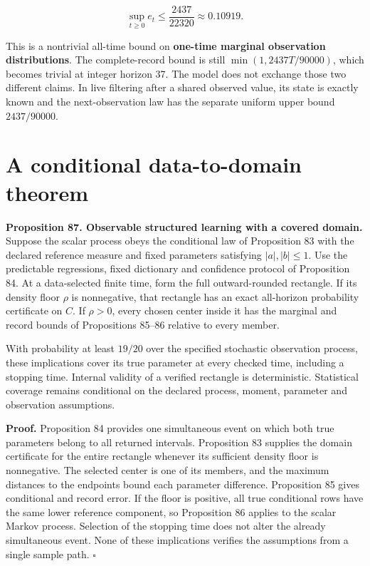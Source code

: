 \[
\boxed{
\sup_{t\geq0}e_t\leq\frac{2437}{22320}
\approx0.10919.
}
\]

This is a nontrivial all-time bound on \textbf{one-time marginal
observation distributions}. The complete-record bound is still
\(\min(1,2437T/90000)\), which becomes trivial at integer horizon 37.
The model does not exchange those two different claims. In live
filtering after a shared observed value, its state is exactly known and
the next-observation law has the separate uniform upper bound
\(2437/90000\).

\section{A conditional data-to-domain theorem}\label{LSM:a-conditional-data-to-domain-theorem}

\textbf{Proposition 87. Observable structured learning with a covered
domain.} Suppose the scalar process obeys the conditional law of
Proposition 83 with the declared reference measure and fixed parameters
satisfying \(|a|,|b|\leq1\). Use the predictable regressions, fixed
dictionary and confidence protocol of Proposition 84. At a data-selected
finite time, form the full outward-rounded rectangle. If its density
floor \(\rho\) is nonnegative, that rectangle has an exact all-horizon
probability certificate on \(C\). If \(\rho>0\), every chosen center
inside it has the marginal and record bounds of Propositions 85--86
relative to every member.

With probability at least \(19/20\) over the specified stochastic
observation process, these implications cover its true parameter at
every checked time, including a stopping time. Internal validity of a
verified rectangle is deterministic. Statistical coverage remains
conditional on the declared process, moment, parameter and observation
assumptions.

\textbf{Proof.} Proposition 84 provides one simultaneous event on which
both true parameters belong to all returned intervals. Proposition 83
supplies the domain certificate for the entire rectangle whenever its
sufficient density floor is nonnegative. The selected center is one of
its members, and the maximum distances to the endpoints bound each
parameter difference. Proposition 85 gives conditional and record error.
If the floor is positive, all true conditional rows have the same lower
reference component, so Proposition 86 applies to the scalar Markov
process. Selection of the stopping time does not alter the already
simultaneous event. None of these implications verifies the assumptions
from a single sample path. \(\square\)

